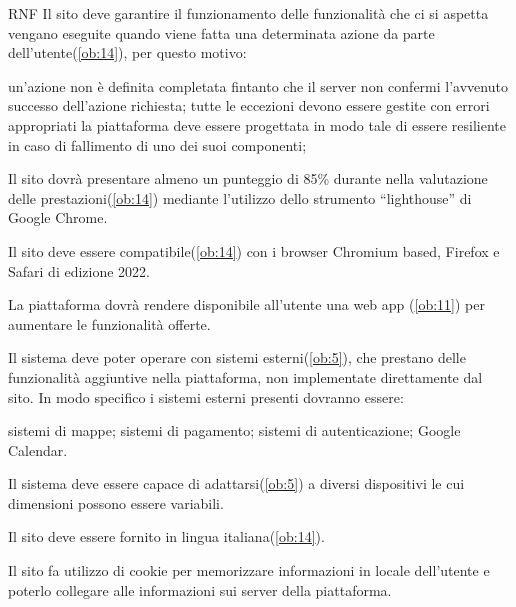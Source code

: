 \begin{listaPersonale}{RNF}
     Il sito deve garantire il funzionamento delle funzionalità che ci si aspetta vengano eseguite quando viene fatta una determinata azione da parte dell'utente(\ref{ob:14}), per questo motivo:
    \begin{listaPersonale2}{}
         un'azione non è definita completata fintanto che il server non confermi l'avvenuto successo dell'azione richiesta;
         tutte le eccezioni devono essere gestite con errori appropriati
         la piattaforma deve essere progettata in modo tale di essere resiliente in caso di fallimento di uno dei suoi componenti;
    \end{listaPersonale2}

     Il sito dovrà presentare almeno un punteggio di 85\% durante nella valutazione delle prestazioni(\ref{ob:14}) mediante l'utilizzo dello strumento “lighthouse” di Google Chrome.

     Il sito deve essere compatibile(\ref{ob:14}) con i browser Chromium based, Firefox e Safari di edizione 2022.

     La piattaforma dovrà rendere disponibile all'utente una web app (\ref{ob:11}) per aumentare le funzionalità offerte.

     Il sistema deve poter operare con sistemi esterni(\ref{ob:5}), che prestano delle funzionalità aggiuntive nella piattaforma, non implementate direttamente dal sito. In modo specifico i sistemi esterni presenti dovranno essere:
    \begin{listaPersonale2}{}
         sistemi di mappe;
         sistemi di pagamento;
         sistemi di autenticazione;
         Google Calendar.
    \end{listaPersonale2}

     Il sistema deve essere capace di adattarsi(\ref{ob:5}) a diversi dispositivi le cui dimensioni possono essere variabili.

     Il sito deve essere fornito in lingua italiana(\ref{ob:14}).

     Il sito fa utilizzo di cookie per memorizzare informazioni in locale dell'utente e poterlo collegare alle informazioni sui server della piattaforma.
\end{listaPersonale}